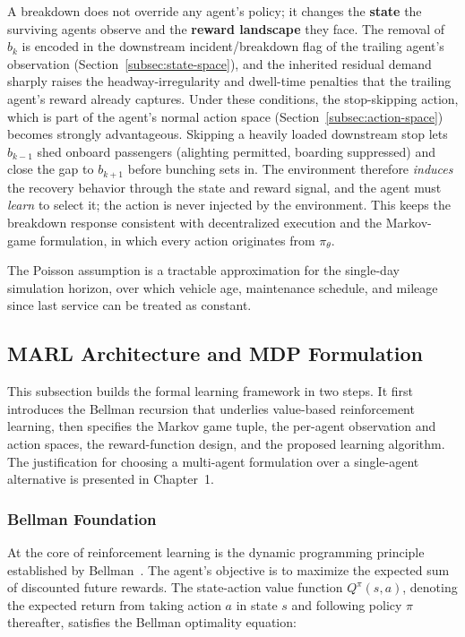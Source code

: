 A breakdown does not override any agent's policy; it changes the \textbf{state} the surviving agents observe and the \textbf{reward landscape} they face. The removal of $b_k$ is encoded in the downstream incident/breakdown flag of the trailing agent's observation (Section~\ref{subsec:state-space}), and the inherited residual demand sharply raises the headway-irregularity and dwell-time penalties that the trailing agent's reward already captures. Under these conditions, the stop-skipping action, which is part of the agent's normal action space (Section~\ref{subsec:action-space}) becomes strongly advantageous. Skipping a heavily loaded downstream stop lets $b_{k-1}$ shed onboard passengers (alighting permitted, boarding suppressed) and close the gap to $b_{k+1}$ before bunching sets in. The environment therefore \textit{induces} the recovery behavior through the state and reward signal, and the agent must \textit{learn} to select it; the action is never injected by the environment. This keeps the breakdown response consistent with decentralized execution and the Markov-game formulation, in which every action originates from $\pi_\theta$.

The Poisson assumption is a tractable approximation for the single-day simulation horizon, over which vehicle age, maintenance schedule, and mileage since last service can be treated as constant.


\subsection{MARL Architecture and MDP Formulation}

This subsection builds the formal learning framework in two steps. It first introduces the Bellman recursion that underlies value-based reinforcement learning, then specifies the Markov game tuple, the per-agent observation and action spaces, the reward-function design, and the proposed learning algorithm. The justification for choosing a multi-agent formulation over a single-agent alternative is presented in Chapter~1.

\subsubsection{Bellman Foundation}

At the core of reinforcement learning is the dynamic programming principle established by Bellman~\cite{Bellman1957}. The agent's objective is to maximize the expected sum of discounted future rewards. The state-action value function $Q^\pi(s,a)$, denoting the expected return from taking action $a$ in state $s$ and following policy $\pi$ thereafter, satisfies the Bellman optimality equation:

